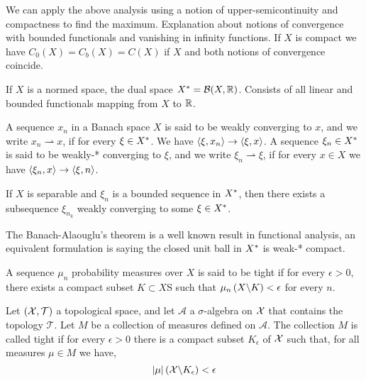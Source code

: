We can apply the above analysis using a notion of upper-semicontinuity and compactness to find the maximum. Explanation about notions of convergence with bounded functionals and vanishing in infinity functions. If $X$ is compact we have $C_0(X)=C_b(X)=C(X)$ if $X$ and both notions of convergence coincide.

\begin{definition}
	If $X$ is a normed space, the dual space ${X}^*=\mathcal B(X, \mathbb{R})$. Consists of all linear and bounded functionals mapping from $X$ to $\mathbb{R}$.
\end{definition}

\begin{definition}
	A sequence $x_n$ in a Banach space $X$ is said to be weakly converging to $x$, and we write $x_n \rightharpoonup x$, if for every $\xi \in {X}^*$. We have $\left\langle \xi, x_n \right\rangle\rightarrow \left\langle \xi, x \right\rangle$. A sequence $\xi_n \in {X}^*$ is said to be weakly-* converging to $\xi$, and we write $\xi_n \rightharpoonup \xi$, if for every $x\in X$ we have $\left\langle \xi_n, x \right\rangle \rightarrow \left\langle \xi, n \right\rangle$.
\end{definition}

\begin{theorem}
	If $X$ is separable and $\xi_n$ is a bounded sequence in ${X}^*$, then there exists a subsequence $\xi_{n_k}$ weakly converging to some $\xi \in {X}^*$.
\end{theorem}
The Banach-Alaouglu's theorem is a well known result in functional analysis, an equivalent formulation is saying the closed unit ball in ${X}^*$ is weak-* compact.

\begin{definition}
	A sequence $\mu_n$ probability measures over $X$ is said to be tight if for every
	$\epsilon> 0$, there exists a compact subset $K\subset X$S such that $\mu_n\left( X\backslash K \right)< \epsilon$ for every $n$.
\end{definition}

\begin{definition}[Tightness] Let $(\mathcal{X}, \mathcal T)$ a topological space, and let $\mathcal A$ a $\sigma$-algebra on $\mathcal{X}$ that contains the topology $\mathcal{T}$. Let $M$ be a collection of measures defined on $\mathcal{A}$. The collection $M$ is called tight  if for every $\epsilon>0$ there is a compact subset $K_\epsilon$  of $\mathcal{X}$ such that, for all measures $\mu\in M$ we have,
	\begin{equation*}
		\left| \mu \right|\left( \mathcal{X} \backslash K_\epsilon \right) < \epsilon
	\end{equation*} 
\end{definition}


